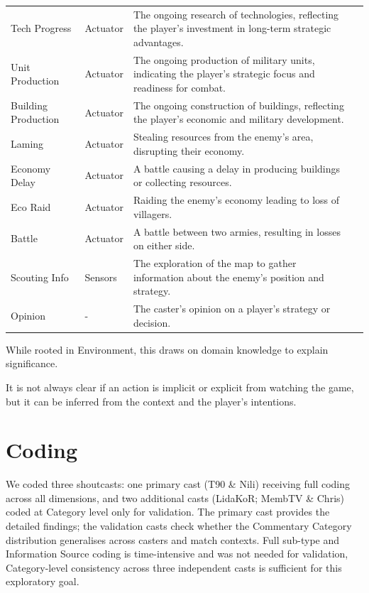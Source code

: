 \begin{table}[htbp]
\begin{threeparttable}
\begin{tabularx}{\textwidth}{@{}>{\arraybackslash}p{3.2cm}>{\arraybackslash}p{2cm}X X@{}}
      Tech Progress        & Actuator & The ongoing research of technologies, reflecting the player's investment in long-term strategic advantages. \\
      Unit Production      & Actuator  & The ongoing production of military units, indicating the player's strategic focus and readiness for combat. \\
      Building Production  & Actuator & The ongoing construction of buildings, reflecting the player's economic and military development. \\
      Laming               & Actuator & Stealing resources from the enemy's area, disrupting their economy. \\
      Economy Delay        & Actuator & A battle causing a delay in producing buildings or collecting resources. \\
      Eco Raid             & Actuator & Raiding the enemy's economy leading to loss of villagers. \\
      Battle               & Actuator & A battle between two armies, resulting in losses on either side. \\
      Scouting Info        & Sensors & The exploration of the map to gather information about the enemy's position and strategy. \\
      Opinion              & - & The caster's opinion on a player's strategy or decision. \\
      \bottomrule
    \end{tabularx}
    \begin{tablenotes}
    \item[1] While rooted in Environment, this draws on domain knowledge to explain significance.
    \item[2] It is not always clear if an action is implicit or explicit from watching the game, but it can be inferred from the context and the player's intentions.
    \end{tablenotes}
    \label{tab:captureage-states}
  \end{threeparttable}
\end{table}

\section{Coding}
\label{subsec:coding}
We coded three shoutcasts: one primary cast (T90 \& Nili) receiving full coding across all dimensions, and two additional casts (LidaKoR; MembTV \& Chris) coded at Category level only for validation. The primary cast provides the detailed findings; the validation casts check whether the Commentary Category distribution generalises across casters and match contexts. Full sub-type and Information Source coding is time-intensive and was not needed for validation, Category-level consistency across three independent casts is sufficient for this exploratory goal.

